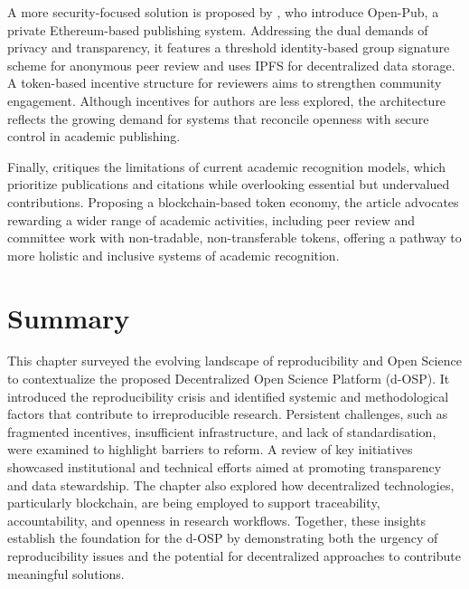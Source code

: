 \documentclass[final]{rc-book-2.14}
\begin{document}
A more security-focused solution is proposed by \cite{zhou_open-pub_2021}, who introduce Open-Pub, a private Ethereum-based publishing system. Addressing the dual demands of privacy and transparency, it features a threshold identity-based group signature scheme for anonymous peer review and uses IPFS for decentralized data storage. A token-based incentive structure for reviewers aims to strengthen community engagement. Although incentives for authors are less explored, the architecture reflects the growing demand for systems that reconcile openness with secure control in academic publishing.

Finally, \cite{lee_unblocking_2023} critiques the limitations of current academic recognition models, which prioritize publications and citations while overlooking essential but undervalued contributions. Proposing a blockchain-based token economy, the article advocates rewarding a wider range of academic activities,  including peer review and committee work with non-tradable, non-transferable tokens, offering a pathway to more holistic and inclusive systems of academic recognition.

\section{Summary}
\label{chp:review:sec:review:summary}

This chapter surveyed the evolving landscape of reproducibility and Open Science to contextualize the proposed Decentralized Open Science Platform (d-OSP). It introduced the reproducibility crisis and identified systemic and methodological factors that contribute to irreproducible research. Persistent challenges, such as fragmented incentives, insufficient infrastructure, and lack of standardisation, were examined to highlight barriers to reform. A review of key initiatives showcased institutional and technical efforts aimed at promoting transparency and data stewardship. The chapter also explored how decentralized technologies, particularly blockchain, are being employed to support traceability, accountability, and openness in research workflows. Together, these insights establish the foundation for the d-OSP by demonstrating both the urgency of reproducibility issues and the potential for decentralized approaches to contribute meaningful solutions.
\end{document}
